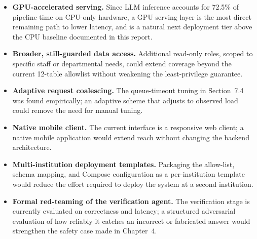 \documentclass[11pt,a4paper,oneside]{report}
\begin{document}
\begin{itemize}[leftmargin=1.5em]
\item \textbf{GPU-accelerated serving.} Since LLM inference accounts for
      72.5\% of pipeline time on CPU-only hardware, a GPU serving layer is
      the most direct remaining path to lower latency, and is a natural next
      deployment tier above the CPU baseline documented in this report.
\item \textbf{Broader, still-guarded data access.} Additional read-only
      roles, scoped to specific staff or departmental needs, could extend
      coverage beyond the current 12-table allowlist without weakening the
      least-privilege guarantee.
\item \textbf{Adaptive request coalescing.} The queue-timeout tuning in
      Section~7.4 was found empirically; an adaptive scheme that adjusts to
      observed load could remove the need for manual tuning.
\item \textbf{Native mobile client.} The current interface is a responsive
      web client; a native mobile application would extend reach without
      changing the backend architecture.
\item \textbf{Multi-institution deployment templates.} Packaging the
      allow-list, schema mapping, and Compose configuration as a
      per-institution template would reduce the effort required to deploy
      the system at a second institution.
\item \textbf{Formal red-teaming of the verification agent.} The
      verification stage is currently evaluated on correctness and latency;
      a structured adversarial evaluation of how reliably it catches an
      incorrect or fabricated answer would strengthen the safety case made
      in Chapter~4.
\end{itemize}
\end{document}
